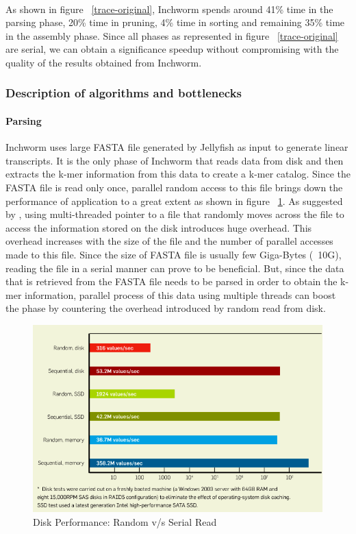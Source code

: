 \label{key}\documentclass[plainarticle, english ,zihtitle,final,hyperref,utf8]{zihpub}
\begin{document}
\paragraph{}
As shown in figure ~\ref{trace-original}, Inchworm spends around 41\% time in the parsing phase, 20\% time in pruning, 4\% time in sorting and remaining 35\% time in the assembly phase. Since all phases as represented in figure ~\ref{trace-original} are serial, we can obtain a significance speedup without compromising with the quality of the results obtained from Inchworm.
\subsubsection{Description of algorithms and bottlenecks}
\paragraph{Parsing} 
Inchworm uses large FASTA file generated by Jellyfish as input to generate linear transcripts. It is the only phase of Inchworm that reads data from disk and then extracts the k-mer information from this data to create a k-mer catalog. Since the FASTA file is read only once, parallel random access to this file brings down the performance of application to a great extent as shown in figure ~\ref{disk}. As suggested by \cite{Jacobs}, using multi-threaded pointer to a file that randomly moves across the file to access the information stored on the disk introduces huge overhead. This overhead increases with the size of the file and the number of parallel accesses made to this file. Since the size of FASTA file is usually few Giga-Bytes (~10G), reading the file in a serial manner can prove to be beneficial. But, since the data that is retrieved from the FASTA file needs to be parsed in order to obtain the k-mer information, parallel process of this data using multiple threads can boost the phase by countering the overhead introduced by random read from disk. 
\begin{figure}[h]
\center
\includegraphics[scale=0.35]{disk}
\caption{Disk Performance: Random v/s Serial Read}
\label{disk}
\end{figure}
\end{document}
